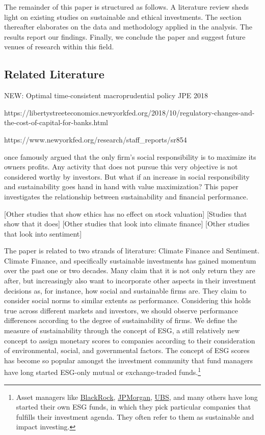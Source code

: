 \documentclass[11pt]{article}
\begin{document}
The remainder of this paper is structured as follows. A literature review sheds light on existing studies on sustainable and ethical investments. The section thereafter elaborates on the data and methodology applied in the analysis. The results report our findings. Finally, we conclude the paper and suggest future venues of research within this field.


\subsection*{Related Literature}

NEW: Optimal time-consistent macroprudential policy JPE 2018

https://libertystreeteconomics.newyorkfed.org/2018/10/regulatory-changes-and-the-cost-of-capital-for-banks.html

https://www.newyorkfed.org/research/staff_reports/sr854


\cite{MiltonFriedman1970} once famously argued that the only firm’s social responsibility is to maximize its owners profits. Any activity that does not pursue this very objective is not considered worthy by investors. But what if an increase in social responsibility and sustainability goes hand in hand with value maximization? This paper investigates the relationship between sustainability and financial performance. 

[Other studies that show ethics has no effect on stock valuation] [Studies that show that it does] [Other studies that look into climate finance] [Other studies that look into sentiment]

The paper is related to two strands of literature: Climate Finance and Sentiment. Climate Finance, and specifically sustainable investments has gained momentum over the past one or two decades. Many claim that it is not only return they are after, but increasingly also want to incorporate other aspects in their investment decisions as, for instance, how social and sustainable firms are. They claim to consider social norms to similar extents as performance. Considering this holds true across different markets and investors, we should observe performance differences according to the degree of sustainability of firms. We define the measure of sustainability through the concept of ESG, a still relatively new concept to assign monetary scores to companies according to their consideration of environmental, social, and governmental factors. The concept of ESG scores has become so popular amongst the investment community that fund managers have long started ESG-only mutual or exchange-traded funds.\footnote{Asset managers like \href{https://www.ishares.com/uk/individual/en/themes/sustainable-investing?switchLocale=y&siteEntryPassthrough=true}{BlackRock}, \href{https://www.jpmorgan.com/country/DK/en/detail/1320566638713}{JPMorgan}, \href{https://www.ubs.com/global/en/asset-management/investment-capabilities/sustainability.html}{UBS}, and many others have long started their own ESG funds, in which they pick particular companies that fulfills their investment agenda. They often refer to them as sustainable and impact investing.} 
\end{document}
